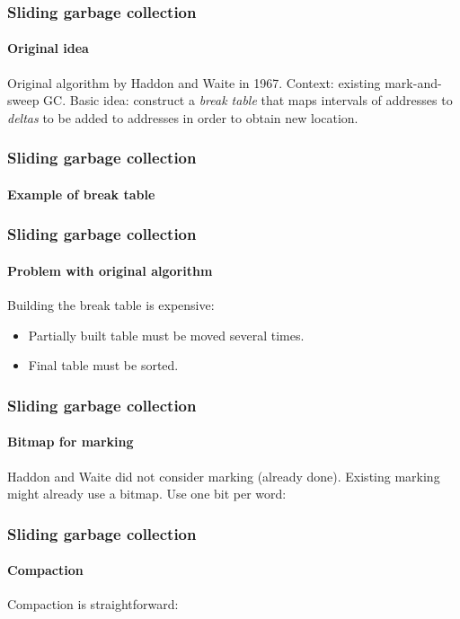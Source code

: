 \documentclass[12pt]{beamer}
\def\inputfig#1{}
\begin{document}
\begin{frame}
  \frametitle{Sliding garbage collection} 
  \framesubtitle{Original idea}

  Original algorithm by Haddon and Waite in 1967.
  \vskip 0.5cm
  Context: existing mark-and-sweep GC.
  \vskip 0.5cm
  Basic idea: construct a \emph{break table} that maps intervals of
  addresses to \emph{deltas} to be added to addresses in order to
  obtain new location. 

\end{frame}
\begin{frame}
  \frametitle{Sliding garbage collection} 
  \framesubtitle{Example of break table}
  \begin{center}
\inputfig{fig-example-aa.pdf_t}
  \end{center}

  \begin{center}
\inputfig{fig-example-da.pdf_t}
  \end{center}

\end{frame}
\begin{frame}
  \frametitle{Sliding garbage collection} 
  \framesubtitle{Problem with original algorithm}

    Building the break table is expensive:

    \begin{itemize}
    \item Partially built table must be moved several times.
    \item Final table must be sorted.  
    \end{itemize}

\end{frame}
\begin{frame}
  \frametitle{Sliding garbage collection} 
  \framesubtitle{Bitmap for marking}

  Haddon and Waite did not consider marking (already done).  Existing
  marking might already use a bitmap.
  \vskip 1cm
  Use one bit per word:

  \begin{center}
\inputfig{fig-example-a.pdf_t}
  \end{center}
\end{frame}
\begin{frame}
  \frametitle{Sliding garbage collection} 
  \framesubtitle{Compaction}

  Compaction is straightforward:

  \begin{center}
\inputfig{fig-example-b.pdf_t}
  \end{center}

  \begin{center}
\inputfig{fig-example-c.pdf_t}
  \end{center}

\end{frame}
\end{document}
